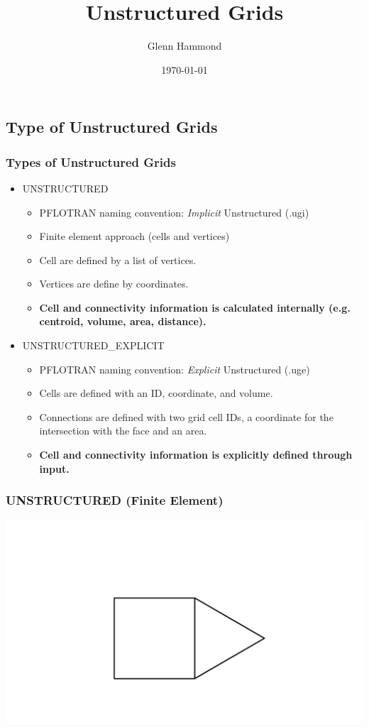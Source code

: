 \documentclass{beamer}
\title{Unstructured Grids}
\author{Glenn Hammond}
\date{\today}
\begin{document}
  
\frame{\titlepage}


\subsection{Type of Unstructured Grids}

\begin{frame}[fragile]\frametitle{Types of Unstructured  Grids}

\begin{itemize}
  \item UNSTRUCTURED
  \begin{itemize}
     \item PFLOTRAN naming convention: \textit{Implicit} Unstructured (.ugi)
     \item Finite element approach (cells and vertices)
     \item Cell are defined by a list of vertices.
     \item Vertices are define by coordinates.
     \item \textbf{Cell and connectivity information is calculated internally (e.g. centroid, volume, area, distance).}
   \end{itemize}
  \item UNSTRUCTURED\_EXPLICIT
  \begin{itemize}
     \item PFLOTRAN naming convention: \textit{Explicit} Unstructured (.uge)
    \item Cells are defined with an ID, coordinate, and volume.
    \item Connections are defined with two grid cell IDs, a coordinate for the intersection with the face and an area.
    \item \textbf{Cell and connectivity information is explicitly defined through input.}
  \end{itemize}
\end{itemize}

\end{frame}

\begin{frame}[fragile]\frametitle{UNSTRUCTURED (Finite Element)}
\vspace{0.2in}
\centering
\includegraphics[width=1\linewidth]{./fe_geom}
\end{frame}
\end{document}

